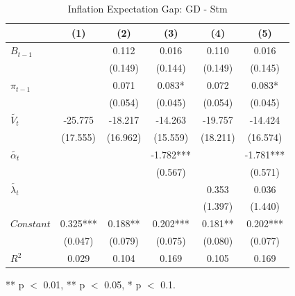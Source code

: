\documentclass[review]{elsarticle}
\begin{document}
\begin{table}[!ht]
\centering 
  \caption{Inflation Expectation Gap: GD - Stm} 
  \label{tab:Inflation Expectation Gap}
\begin{tabular}{l*{5}{c}}   
\toprule
                    & (1) & (2) & (3) & (4) & (5) \\
\midrule
$B_{t-1}$           &     & 0.112 & 0.016 & 0.110 & 0.016 \\
                    &     & (0.149) & (0.144) & (0.149) & (0.145) \\
$\pi_{t-1}$         &     & 0.071 & 0.083* & 0.072 & 0.083* \\
                    &     & (0.054) & (0.045) & (0.054) & (0.045) \\
$\tilde{V_t}$       & -25.775 & -18.217 & -14.263 & -19.757 & -14.424 \\
                    & (17.555) & (16.962) & (15.559) & (18.211) & (16.574) \\
$\tilde{\alpha_t}$  &     &     & -1.782*** &     & -1.781*** \\
                    &     &     & (0.567) &     & (0.571) \\
$\tilde{\lambda_t}$ &     &     &     & 0.353 & 0.036 \\
                    &     &     &     & (1.397) & (1.440) \\
$Constant$          & 0.325*** & 0.188** & 0.202*** & 0.181** & 0.202*** \\
                    & (0.047) & (0.079) & (0.075) & (0.080) & (0.077) \\
\midrule
$R^2$               & 0.029 & 0.104 & 0.169 & 0.105 & 0.169 \\
\bottomrule
\end{tabular} 
\parbox{0.8\textwidth}{\centering \small *** p $<$ 0.01, ** p $<$ 0.05, * p $<$ 0.1.}
\end{table}
\end{document}
